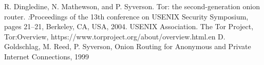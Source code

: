 \begin{thebibliography}{50}
		R. Dingledine, N. Mathewson, and P. Syverson. 
		Tor: the second-generation onion router. 
		\textsl:{Proceedings of the 13th conference on USENIX Security Symposium}, 
		pages 21–21, Berkeley, CA, USA, 2004.
		USENIX Association.
		The Tor Project,
		Tor:Overview,
		https://www.torproject.org/about/overview.html.en		
		D. Goldschlag, M. Reed, P. Syverson,
		Onion Routing for Anonymous and Private Internet Connections,
		1999	
		
\end{thebibliography}
